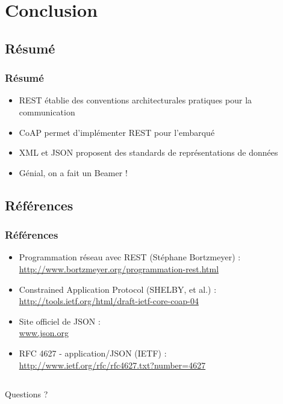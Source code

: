\documentclass{beamer}
\begin{document}
\section{Conclusion}

    \subsection{Résumé}
    \begin{frame}
        \frametitle{Résumé}
        \begin{itemize}
            \item REST établie des conventions architecturales pratiques pour la communication
            \item CoAP permet d'implémenter REST pour l'embarqué
            \item XML et JSON proposent des standards de représentations de données
            \pause
            \item Génial, on a fait un Beamer !
        \end{itemize}
    \end{frame}

    \subsection{Références}
    \begin{frame}
        \frametitle{Références}
        \begin{itemize}
            \item \normalsize Programmation réseau avec REST (Stéphane Bortzmeyer) :\\
                \small \url{http://www.bortzmeyer.org/programmation-rest.html}
            \item \normalsize Constrained Application Protocol (SHELBY, et al.) :\\
                \small \url{http://tools.ietf.org/html/draft-ietf-core-coap-04}
            \item \normalsize Site officiel de JSON :\\
                \small \url{www.json.org}
            \item \normalsize RFC 4627 - application/JSON (IETF) :\\
                \small \url{http://www.ietf.org/rfc/rfc4627.txt?number=4627}
        \end{itemize}
    \end{frame}

    \subsection{}
    \begin{frame}
        \begin{center}
        \Huge{Questions ?}
        \end{center}
    \end{frame}

\end{document}
